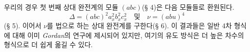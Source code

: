 
우리의 경우 첫 번째 상대 완전계의 모듈 $(abc)$(§ 4)은 다음 모듈들로 환원된다.
\[
\Delta=(abc)^2a_x^2b_x^2c_x^2\quad\text{및}\quad \nu=(abu)^4
\]
(§ 5). 이어서 $\nu$를 법으로 하는 상대 완전계를 구한다(§ 6). 이 결과들은 일반 4차 형식에 대해 이미 \emph{Gordan}의 연구에 제시되어 있지만, 여기의 유도 방식은 더 높은 차수의 형식으로 더 쉽게 옮길 수 있다.

